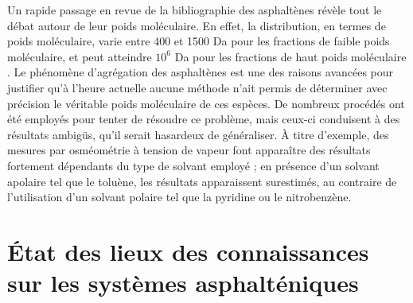 \documentclass[12pt,a4paper]{book}
\begin{document}
Un rapide passage en revue de la bibliographie des asphaltènes révèle tout le débat autour de leur poids moléculaire. En effet, la distribution, en termes de poids moléculaire, varie entre 400 et 1500 Da pour les fractions de faible poids moléculaire, et peut atteindre $10^{6}$ Da pour les fractions de haut poids moléculaire \cite{mullins2008contrasting}. Le phénomène d'agrégation des asphaltènes est une des raisons avancées pour justifier qu'à l'heure actuelle aucune méthode n'ait permis de déterminer avec précision le véritable poids moléculaire de ces espèces. De nombreux procédés ont été employés pour tenter de résoudre ce problème, mais ceux-ci conduisent à des résultats ambigüs, qu'il serait hasardeux de généraliser. À titre d'exemple, des mesures par osméométrie à tension de vapeur font apparaître des résultats fortement dépendants du type de solvant employé ; en présence d'un solvant apolaire tel que le toluène, les résultats apparaissent surestimés, au contraire de l'utilisation d'un solvant polaire tel que la pyridine ou le nitrobenzène. 




\section{État des lieux des connaissances sur les systèmes asphalténiques}
\end{document}
